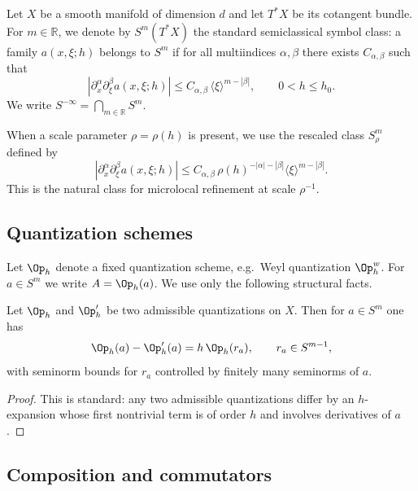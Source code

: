 Let $X$ be a smooth manifold of dimension $d$ and let $T^\ast X$ be its cotangent bundle.
For $m\in\mathbb{R}$, we denote by $S^m(T^\ast X)$ the standard semiclassical symbol class:
a family $a(x,\xi;h)$ belongs to $S^m$ if for all multiindices $\alpha,\beta$ there exists $C_{\alpha,\beta}$ such that
\begin{equation}
\label{eq:C.symbol-est}
\left|\partial_x^\alpha\partial_\xi^\beta a(x,\xi;h)\right|
\le
C_{\alpha,\beta}\,\langle\xi\rangle^{m-|\beta|},
\qquad
0<h\le h_0.
\end{equation}
We write $S^{-\infty}=\bigcap_{m\in\mathbb{R}}S^m$.

When a scale parameter $\rho=\rho(h)$ is present, we use the rescaled class $S^m_\rho$ defined by
\begin{equation}
\label{eq:C.symbol-est-rho}
\left|\partial_x^\alpha\partial_\xi^\beta a(x,\xi;h)\right|
\le
C_{\alpha,\beta}\,\rho(h)^{-|\alpha|-|\beta|}\langle\xi\rangle^{m-|\beta|}.
\end{equation}
This is the natural class for microlocal refinement at scale $\rho^{-1}$.

\subsection{Quantization schemes}
\label{subsec:C.quantization}

Let $\Op_h$ denote a fixed quantization scheme, e.g.\ Weyl quantization $\Op_h^w$.
For $a\in S^m$ we write $A=\Op_h(a)$.
We use only the following structural facts.

\begin{proposition}
\label{prop:C.quant-stability}
Let $\Op_h$ and $\Op'_h$ be two admissible quantizations on $X$.
Then for $a\in S^m$ one has
\[
\Op_h(a)-\Op'_h(a)=h\,\Op_h(r_a),
\qquad
r_a\in S^{m-1},
\]
with seminorm bounds for $r_a$ controlled by finitely many seminorms of $a$.
\end{proposition}

\begin{proof}
This is standard: any two admissible quantizations differ by an $h$-expansion whose first nontrivial term is of order
$h$ and involves derivatives of $a$.
\end{proof}

\subsection{Composition and commutators}
\label{subsec:C.composition}

